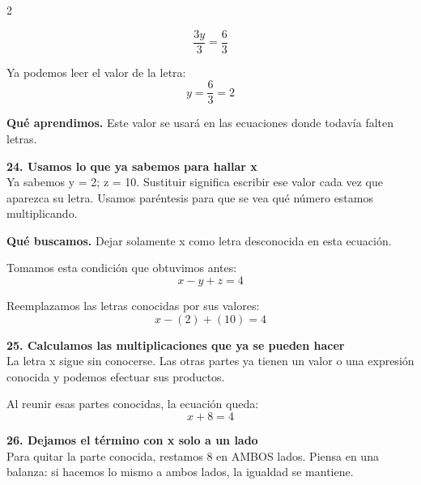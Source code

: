 \documentclass[11pt,a4paper,landscape]{article}
\begin{document}
\begin{multicols*}{2}
\begin{minipage}{\linewidth}
\[\frac{3y}{3}=\frac{6}{3}\]
\par\smallskip Ya podemos leer el valor de la letra:
\[y=\frac{6}{3}=2\]
\par\smallskip\textbf{Qué aprendimos.} Este valor se usará en las ecuaciones donde todavía falten letras.
\end{minipage}\par\medskip
\noindent\begin{minipage}{\linewidth}\textbf{24. Usamos lo que ya sabemos para hallar x}\\[2pt]Ya sabemos y = 2; z = 10. Sustituir significa escribir ese valor cada vez que aparezca su letra. Usamos paréntesis para que se vea qué número estamos multiplicando.
\par\smallskip\textbf{Qué buscamos.} Dejar solamente x como letra desconocida en esta ecuación.
\par\smallskip Tomamos esta condición que obtuvimos antes:
\[x - y + z = 4\]
\par\smallskip Reemplazamos las letras conocidas por sus valores:
\[x - \left(2\right) + \left(10\right)=4\]
\end{minipage}\par\medskip
\noindent\begin{minipage}{\linewidth}\textbf{25. Calculamos las multiplicaciones que ya se pueden hacer}\\[2pt]La letra x sigue sin conocerse. Las otras partes ya tienen un valor o una expresión conocida y podemos efectuar sus productos.
\par{}\par\smallskip
\par\smallskip Al reunir esas partes conocidas, la ecuación queda:
\[x + 8=4\]
\end{minipage}\par\medskip
\noindent\begin{minipage}{\linewidth}\textbf{26. Dejamos el término con x solo a un lado}\\[2pt]Para quitar la parte conocida, restamos 8 en AMBOS lados. Piensa en una balanza: si hacemos lo mismo a ambos lados, la igualdad se mantiene.

\end{minipage}
\end{multicols*}
\end{document}
